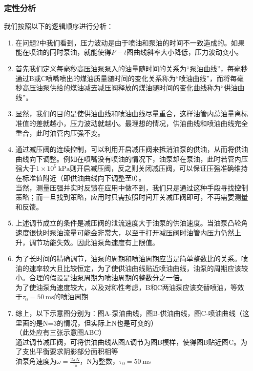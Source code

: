 \documentclass{article}
\newcommand{\prb}{\times 10^5~\mathrm{kPa}}
\newcommand{\tim}{~\mathrm{ms}}
\begin{document}
	\subsubsection{定性分析}
	我们按照以下的逻辑顺序进行分析：
		\begin{enumerate}
		\item 
		在问题2中我们看到，压力波动是由于喷油和泵油的时间不一致造成的。如果能在喷油的同时泵油，就能使得$P-t$图曲线斜率大小降低，压力波动变小。
		\item 
		首先我们定义每毫秒高压油泵泵入的油量随时间的关系为“泵油曲线”，每毫秒通过B或C喷嘴喷出的煤油质量随时间的变化关系称为“喷油曲线”，而将每毫秒高压油泵供给的煤油减去减压阀释放的煤油随时间的变化曲线称为“供油曲线”。
		\item 
		显然，我们的目的是使供油曲线和喷油曲线尽量重合，这样油管内总油量离标准值的差就越小，压力波动就越小。最理想的情况，供油曲线和喷油曲线完全重合，此时油管内压强不变。
		\item
		通过减压阀的连续控制，可以利用开启减压阀来抵消油泵的供油，从而将供油曲线向下调整。例如在喷嘴没有喷油的情况下，油泵却在泵油，此时若管内压强大于$1\prb$则开启减压阀，反之则关闭减压阀，可以保证压强准确维持在标准值附近（即供油曲线向下调整至0）。\\当然，测量压强并实时反馈在应用中做不到，我们只是通过这种手段寻找控制策略；而一旦找到策略，应用时只需按照时间开关减压阀即可，不再需要测量和反馈。
		\item 
		上述调节成立的条件是减压阀的泄流速度大于油泵的供油速度。当油泵凸轮角速度很快时泵油流量可能会非常大，以至于打开减压阀时油管内压力仍然上升，调节功能失效。因此油泵角速度有上限值。
		\item 
		为了长时间的精确调节，油泵的周期和喷油周期应当是简单整数比的关系。喷油的速率较大且比较恒定，为了使供油曲线贴近喷油曲线，油泵的周期应该较小。合理的假设是油泵周期为喷油周期的整数分之一倍。\\
		为了使油泵角速度较大，以及对称性考虑，B和C两油泵应该交替喷油，等效于$\tau_0=50\tim$的喷油周期
		\item
		综上，以下示意图分别为：图A-泵油曲线，图B-供油曲线，图C-喷油曲线（这里画的是N=3的情况，但实际上N也是可变的）\\
		
		（此处应有三张示意图ABC）\\
		
		通过调节减压阀，可将供油曲线从图A调节为图B模样，使得图B贴近图C。为了支出平衡要求阴影部分面积相等\\
		油泵角速度为$\omega=\frac{2\pi{}N}{\tau_0}$，N为整数，$\tau_0=50\tim$
	\end{enumerate}
\end{document}
